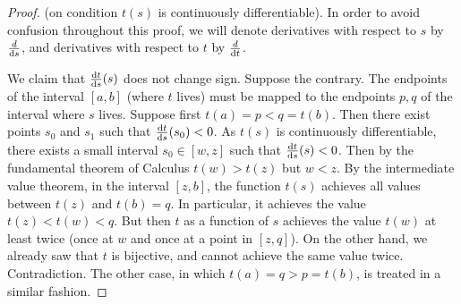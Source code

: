 \documentclass[12pt]{book}
\begin{document}
\begin{proof} (on condition $t(s)$ is continuously differentiable). In order to avoid confusion throughout this proof, we will denote derivatives with respect to $s$ by $\frac{d}{{\normalfont \text{d}} s}$, and derivatives with respect to $t$ by $\frac{d}{{\normalfont \text{d}} t}$.

We claim that $\frac{{\normalfont \text{d}} t}{{\normalfont \text{d}} s}(s)$ does not change sign. Suppose the contrary. The endpoints of the interval $[a,b]$ (where $t$ lives) must be mapped to the endpoints $p,q$ of the interval where $s$ lives. Suppose first $t(a)=p<q=t(b)$.  Then there exist points $s_0$ and $s_1$ such that  $\frac{{\normalfont \text{d}} t}{{\normalfont \text{d}} s}(s_0)<0$. As $t(s)$ is continuously differentiable, there exists a small interval  $s_0\in [w, z]$ such that $\frac{{\normalfont \text{d}} t}{{\normalfont \text{d}} s}(s)<0$. Then by the fundamental theorem of Calculus $t(w)>t(z)$ but $w<z$. By the intermediate value theorem, in the interval $[z,b]$, the function $t(s)$ achieves all values between $t(z)$ and $t(b)=q$. In particular, it achieves the value $t(z)<t(w)<q$. But then $t$ as a function of $s$ achieves the value $t(w)$ at least twice (once at $w$ and once at a point in $[z,q]$). On the other hand, we already saw that $t$ is bijective, and cannot achieve the same value twice. Contradiction. The other case, in which $t(a)=q>p=t(b)$, is treated in a similar fashion.


\end{proof}
\end{document}
